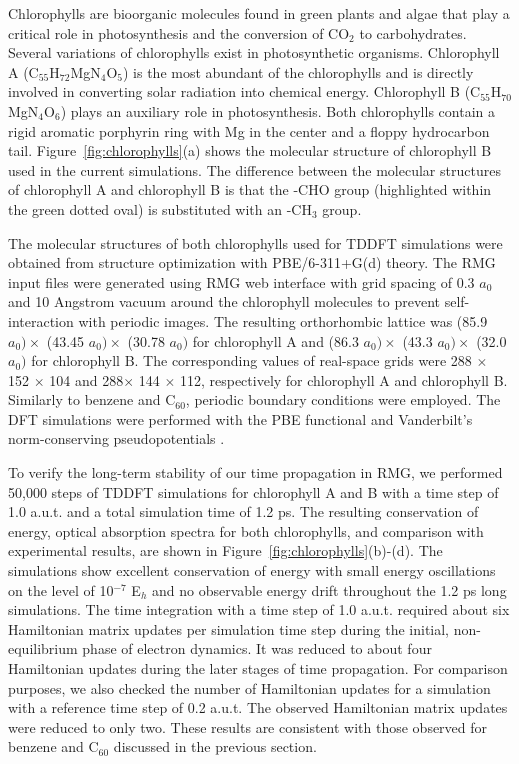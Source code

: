 \documentclass[journal=jctcce,manuscript=article,etalmode=truncate,maxauthors=10,layout=twocolumn,9pt]{achemso}   %
\begin{document}
Chlorophylls are bioorganic molecules found in green plants and algae that play a critical role in photosynthesis and the conversion of CO$_2$ to carbohydrates. Several variations of chlorophylls exist in photosynthetic organisms. Chlorophyll A (C$_{55}$H$_{72}$MgN$_4$O$_5$) is the most abundant of the  chlorophylls and is directly involved in converting solar radiation into chemical energy. Chlorophyll B (C$_{55}$H$_{70}$MgN$_4$O$_6$) plays an auxiliary role in photosynthesis. Both chlorophylls contain a rigid aromatic porphyrin ring with Mg in the center and a floppy hydrocarbon tail.  Figure~\ref{fig:chlorophylls}(a)  shows the molecular structure of chlorophyll B used in the current simulations. The difference between the molecular structures of chlorophyll A and chlorophyll B is that the -CHO group (highlighted within the green dotted oval) is substituted with an -CH$_3$ group.




The molecular structures of both chlorophylls used for TDDFT simulations were obtained from structure optimization with  PBE/6-311+G(d) theory.
The RMG input files were generated using RMG web interface \cite{RMG-DFT-gui} with grid spacing of 0.3 $a_0$ and  10 Angstrom vacuum around the chlorophyll molecules to prevent self-interaction with periodic images. The resulting orthorhombic lattice was   (85.9 $a_0) \times$  (43.45  $a_0) \times$  (30.78  $a_0)$ for chlorophyll A and (86.3  $a_0) \times$   (43.3  $a_0) \times$  (32.0 $a_0)$  for chlorophyll B.
 The corresponding  values  of real-space grids were 288 $\times$ 152 $\times$ 104 and 288$\times$ 144 $\times$ 112, respectively for chlorophyll A  and chlorophyll B.
Similarly to benzene and C$_{60}$, periodic boundary conditions were employed.
The DFT simulations were performed  with the PBE functional and Vanderbilt's norm-conserving pseudopotentials \cite{Vanderbilt}.

 

To verify the long-term stability of our  time propagation in RMG, we performed 50,000 steps of TDDFT simulations for chlorophyll A and B with a time step of 1.0 a.u.t. and a total simulation time of 1.2 ps. The resulting conservation of energy, optical absorption spectra for both chlorophylls, and  comparison with experimental results, are shown in Figure~\ref{fig:chlorophylls}(b)-(d). The  simulations show excellent conservation of energy with small energy oscillations on the level of 10$^{-7}$ E$_h$ and no observable energy drift throughout the 1.2 ps long simulations. The time integration with a time step of 1.0 a.u.t. required about six Hamiltonian matrix updates per simulation time step during the initial, non-equilibrium phase of electron dynamics.  It was reduced to about four Hamiltonian  updates during the later stages of time propagation. For comparison purposes, we also checked the number of Hamiltonian updates for a simulation with a  reference time step of 0.2 a.u.t. The observed Hamiltonian matrix updates were reduced to only two. These results are consistent with those observed for benzene and C$_{60}$ discussed in the previous section.
\end{document}
